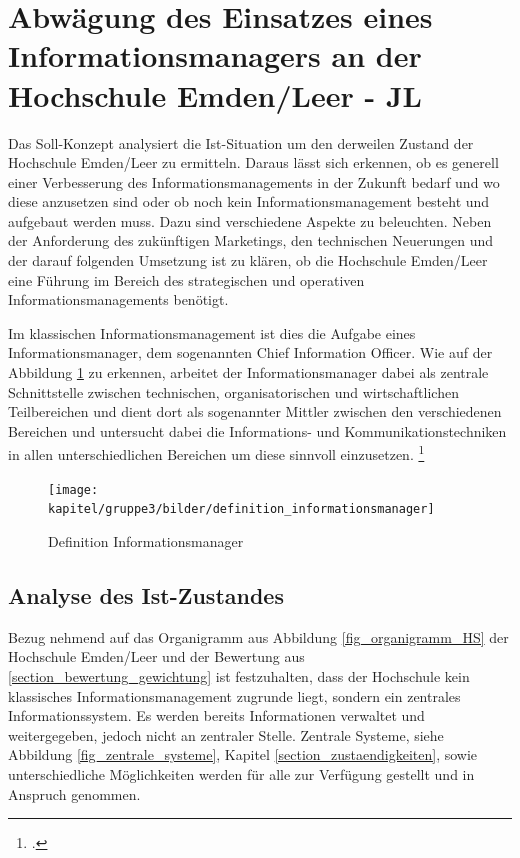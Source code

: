 \section{Abwägung des Einsatzes eines Informationsmanagers an der Hochschule Emden/Leer - JL}
\label{section_einsatz_cio}

Das Soll-Konzept analysiert die Ist-Situation um den derweilen Zustand der  Hochschule Emden/Leer zu ermitteln. Daraus lässt sich erkennen, ob es generell einer Verbesserung des Informationsmanagements in der Zukunft bedarf und wo diese anzusetzen sind oder ob noch kein Informationsmanagement besteht und aufgebaut werden muss. Dazu sind verschiedene Aspekte zu beleuchten. Neben der Anforderung des zukünftigen Marketings, den technischen Neuerungen und der darauf folgenden Umsetzung ist zu klären, ob die Hochschule Emden/Leer eine Führung im Bereich des strategischen und operativen Informationsmanagements benötigt.

Im klassischen Informationsmanagement ist dies die Aufgabe eines Informationsmanager, dem sogenannten Chief Information Officer. Wie auf der Abbildung \ref{fig_def_inm} zu erkennen, arbeitet der Informationsmanager dabei als zentrale Schnittstelle zwischen technischen, organisatorischen und wirtschaftlichen Teilbereichen und dient dort als sogenannter Mittler zwischen den verschiedenen Bereichen und untersucht dabei die Informations- und Kommunikationstechniken in allen unterschiedlichen Bereichen um diese sinnvoll einzusetzen. 
\footcite[86]{definition_informationsmanager}

\begin{figure}[h]
	\centering
	\texttt{[image: kapitel/gruppe3/bilder/definition\_informationsmanager]}
	\caption{Definition Informationsmanager}
	\label{fig_def_inm}
\end{figure}
\clearpage

\subsection{Analyse des Ist-Zustandes}
\label{subsection_analyse_ist_zustand}

Bezug nehmend auf das Organigramm aus Abbildung \ref{fig_organigramm_HS} der Hochschule Emden/Leer und der Bewertung aus  \ref{section_bewertung_gewichtung} ist festzuhalten, dass der Hochschule kein klassisches Informationsmanagement zugrunde liegt, sondern ein zentrales Informationssystem. Es werden bereits Informationen verwaltet und weitergegeben, jedoch nicht an zentraler Stelle. Zentrale Systeme, siehe Abbildung \ref{fig_zentrale_systeme}, Kapitel \ref{section_zustaendigkeiten}, sowie unterschiedliche Möglichkeiten werden für alle zur Verfügung gestellt und in Anspruch genommen. 

